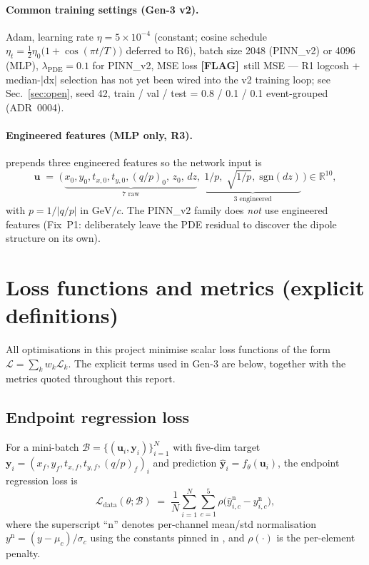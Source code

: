 \documentclass[11pt,a4paper]{article}
\newcommand{\flag}[1]{\textcolor{red!70!black}{\textbf{[FLAG]}~#1}}
\newcommand{\file}[1]{\texttt{\detokenize{#1}}}
\begin{document}
\paragraph{Common training settings (Gen-3 v2).}
Adam, learning rate $\eta=5\times 10^{-4}$ (constant; cosine schedule
$\eta_t=\tfrac{1}{2}\eta_0\bigl(1+\cos(\pi t/T)\bigr)$ deferred to
R6), batch size 2048 (PINN\_v2) or 4096 (MLP),
$\lambda_{\mathrm{PDE}}=0.1$ for PINN\_v2, MSE loss \flag{still
MSE — R1 logcosh + median-|dx| selection has not yet been wired
into the v2 training loop; see Sec.~\ref{sec:open}}, seed 42, train /
val / test = 0.8 / 0.1 / 0.1 event-grouped (ADR~0004).

\paragraph{Engineered features (MLP only, R3).}
\file{mlp_*_v2} prepends three engineered features so the network
input is
\[
  \mathbf{u} \;=\; \bigl(\,
      \underbrace{x_0,y_0,t_{x,0},t_{y,0},(q/p)_0,\,z_0,\,dz}_{\text{7 raw}},\;
      \underbrace{1/p,\;\sqrt{1/p},\;\mathrm{sgn}(dz)}_{\text{3 engineered}}
    \,\bigr)\in\mathbb{R}^{10},
\]
with $p=1/|q/p|$ in $\text{GeV}/c$. The PINN\_v2 family does
\emph{not} use engineered features (Fix~P1: deliberately leave the
PDE residual to discover the dipole structure on its own).

\section{Loss functions and metrics (explicit definitions)}
\label{sec:math}

\noindent All optimisations in this project minimise scalar loss
functions of the form $\mathcal{L}=\sum_k w_k\mathcal{L}_k$. The
explicit terms used in Gen-3 are below, together with the metrics
quoted throughout this report.

\subsection{Endpoint regression loss}

For a mini-batch $\mathcal{B}=\{(\mathbf{u}_i,\mathbf{y}_i)\}_{i=1}^{N}$
with five-dim target $\mathbf{y}_i=(x_f,y_f,t_{x,f},t_{y,f},(q/p)_f)_i$
and prediction $\hat{\mathbf{y}}_i=f_\theta(\mathbf{u}_i)$, the
endpoint regression loss is
\[
  \mathcal{L}_{\mathrm{data}}(\theta;\mathcal{B})
  \;=\; \frac{1}{N}\sum_{i=1}^{N}\sum_{c=1}^{5}
        \rho\!\bigl(\hat{y}_{i,c}^{\mathrm{n}} - y_{i,c}^{\mathrm{n}}\bigr),
\]
where the superscript ``n'' denotes per-channel mean/std
normalisation
$y^{\mathrm{n}}=(y-\mu_c)/\sigma_c$ using the constants pinned in
\file{normalization.json}, and $\rho(\cdot)$ is the per-element
penalty.
\end{document}
